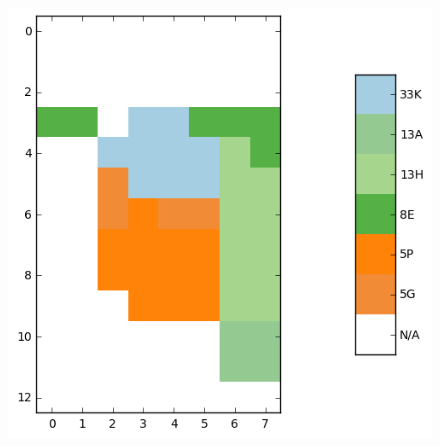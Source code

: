 \begin{figure}
\begin{minipage}[c]{.33\linewidth}
  \end{minipage} \hfill
  \begin{minipage}[c]{.32\linewidth}
    \includegraphics[width=\linewidth]{figures/sample2_labels.png}
  \end{minipage}
  

\end{figure}
